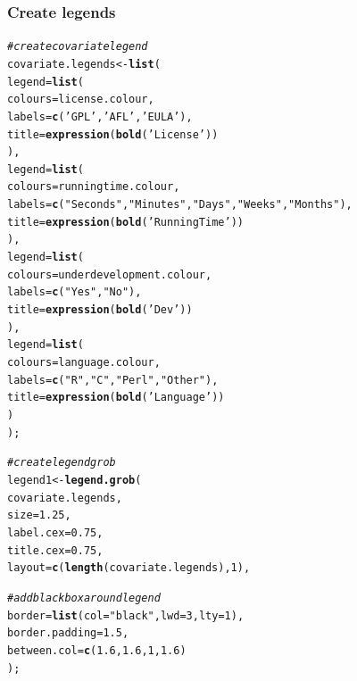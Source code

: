 \documentclass[letterpaper]{report}\usepackage[]{graphicx}\usepackage[]{color}
\makeatletter
\newcommand{\hlnum}[1]{\textcolor[rgb]{0.686,0.059,0.569}{#1}}%
\newcommand{\hlstr}[1]{\textcolor[rgb]{0.192,0.494,0.8}{#1}}%
\newcommand{\hlcom}[1]{\textcolor[rgb]{0.678,0.584,0.686}{\textit{#1}}}%
\newcommand{\hlstd}[1]{\textcolor[rgb]{0.345,0.345,0.345}{#1}}%
\newcommand{\hlkwb}[1]{\textcolor[rgb]{0.69,0.353,0.396}{#1}}%
\newcommand{\hlkwc}[1]{\textcolor[rgb]{0.333,0.667,0.333}{#1}}%
\newcommand{\hlkwd}[1]{\textcolor[rgb]{0.737,0.353,0.396}{\textbf{#1}}}%
\newenvironment{kframe}{%
 \def\at@end@of@kframe{}%
 \ifinner\ifhmode%
  \def\at@end@of@kframe{\end{minipage}}%
  \begin{minipage}{\columnwidth}%
 \fi\fi%
 \def\FrameCommand##1{\hskip\@totalleftmargin \hskip-\fboxsep
 \colorbox{shadecolor}{##1}\hskip-\fboxsep
     \hskip-\linewidth \hskip-\@totalleftmargin \hskip\columnwidth}%
 \MakeFramed {\advance\hsize-\width
   \@totalleftmargin\z@ \linewidth\hsize
   \@setminipage}}%
 {\par\unskip\endMakeFramed%
 \at@end@of@kframe}
\newenvironment{knitrout}{}{} %
\makeatother
\begin{document}
\subsubsection{Create legends}
\begin{knitrout}
\color{fgcolor}\begin{kframe}
\begin{alltt}
\hlcom{# create covariate legend}
\hlstd{covariate.legends} \hlkwb{<-} \hlkwd{list}\hlstd{(}
    \hlkwc{legend} \hlstd{=} \hlkwd{list}\hlstd{(}
        \hlkwc{colours} \hlstd{= license.colour,}
        \hlkwc{labels}  \hlstd{=} \hlkwd{c}\hlstd{(}\hlstr{'GPL'}\hlstd{,} \hlstr{'AFL'}\hlstd{,} \hlstr{'EULA'}\hlstd{),}
        \hlkwc{title}   \hlstd{=} \hlkwd{expression}\hlstd{(}\hlkwd{bold}\hlstd{(}\hlstr{'License'}\hlstd{))}
        \hlstd{),}
    \hlkwc{legend} \hlstd{=} \hlkwd{list}\hlstd{(}
        \hlkwc{colours} \hlstd{= runningtime.colour,}
        \hlkwc{labels}  \hlstd{=} \hlkwd{c}\hlstd{(}\hlstr{"Seconds"}\hlstd{,} \hlstr{"Minutes"}\hlstd{,} \hlstr{"Days"}\hlstd{,} \hlstr{"Weeks"}\hlstd{,} \hlstr{"Months"}\hlstd{),}
        \hlkwc{title}   \hlstd{=} \hlkwd{expression}\hlstd{(}\hlkwd{bold}\hlstd{(}\hlstr{'Running Time'}\hlstd{))}
        \hlstd{),}
    \hlkwc{legend} \hlstd{=} \hlkwd{list}\hlstd{(}
        \hlkwc{colours} \hlstd{= underdevelopment.colour,}
        \hlkwc{labels}  \hlstd{=} \hlkwd{c}\hlstd{(}\hlstr{"Yes"}\hlstd{,} \hlstr{"No"}\hlstd{),}
        \hlkwc{title}   \hlstd{=} \hlkwd{expression}\hlstd{(}\hlkwd{bold}\hlstd{(}\hlstr{'Dev'}\hlstd{))}
        \hlstd{),}
    \hlkwc{legend} \hlstd{=} \hlkwd{list}\hlstd{(}
        \hlkwc{colours} \hlstd{= language.colour,}
        \hlkwc{labels}  \hlstd{=} \hlkwd{c}\hlstd{(}\hlstr{"R"}\hlstd{,} \hlstr{"C"}\hlstd{,} \hlstr{"Perl"}\hlstd{,} \hlstr{"Other"}\hlstd{),}
        \hlkwc{title}   \hlstd{=} \hlkwd{expression}\hlstd{(}\hlkwd{bold}\hlstd{(}\hlstr{'Language'}\hlstd{))}
        \hlstd{)}
    \hlstd{);}

\hlcom{# create legend grob}
\hlstd{legend1} \hlkwb{<-} \hlkwd{legend.grob}\hlstd{(}
    \hlstd{covariate.legends,}
    \hlkwc{size} \hlstd{=} \hlnum{1.25}\hlstd{,}
    \hlkwc{label.cex} \hlstd{=} \hlnum{0.75}\hlstd{,}
    \hlkwc{title.cex} \hlstd{=} \hlnum{0.75}\hlstd{,}
    \hlkwc{layout} \hlstd{=} \hlkwd{c}\hlstd{(}\hlkwd{length}\hlstd{(covariate.legends),} \hlnum{1}\hlstd{),}

    \hlcom{# add black box around legend}
    \hlkwc{border} \hlstd{=} \hlkwd{list}\hlstd{(}\hlkwc{col} \hlstd{=} \hlstr{"black"}\hlstd{,} \hlkwc{lwd} \hlstd{=} \hlnum{3}\hlstd{,} \hlkwc{lty} \hlstd{=} \hlnum{1}\hlstd{),}
    \hlkwc{border.padding} \hlstd{=} \hlnum{1.5}\hlstd{,}
    \hlkwc{between.col} \hlstd{=} \hlkwd{c}\hlstd{(}\hlnum{1.6}\hlstd{,} \hlnum{1.6}\hlstd{,} \hlnum{1}\hlstd{,} \hlnum{1.6}\hlstd{)}
    \hlstd{);}



\end{alltt}
\end{kframe}
\end{knitrout}
\end{document}
